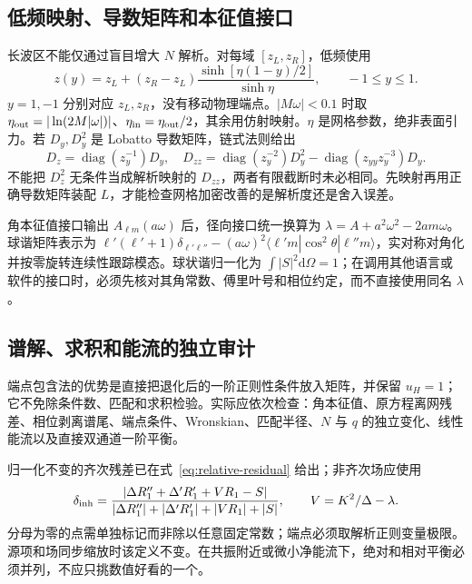 \documentclass[UTF8,fontset=fandol,11pt,a4paper,oneside]{ctexart}
\numberwithin{equation}{section}
\newcommand{\dd}{\mathrm d}
\begin{document}
\subsection{低频映射、导数矩阵和本征值接口}
长波区不能仅通过盲目增大 $N$ 解析。对每域 $[z_L,\allowbreak z_R]$，低频使用
\begin{equation}
 z(y)=z_L+(z_R-z_L)\frac{\sinh[\eta(1-y)/2]}{\sinh\eta},\qquad -1\le y\le1.
\end{equation}
$y=1,\allowbreak -1$ 分别对应 $z_L,\allowbreak z_R$，没有移动物理端点。$|M\omega|<0.1$ 时取 $\eta_{\rm out}=|\ln(2M|\omega|)|$、$\eta_{\rm in}=\eta_{\rm out}/2$，其余用仿射映射。$\eta$ 是网格参数，绝非表面引力。若 $D_y,\allowbreak D_y^2$ 是 Lobatto 导数矩阵，链式法则给出
\begin{equation}
 D_z=\operatorname{diag}(z_y^{-1})D_y,\quad
 D_{zz}=\operatorname{diag}(z_y^{-2})D_y^2
 -\operatorname{diag}(z_{yy}z_y^{-3})D_y.
\end{equation}
不能把 $D_z^2$ 无条件当成解析映射的 $D_{zz}$，两者有限截断时未必相同。先映射再用正确导数矩阵装配 $L$，才能检查网格加密改善的是解析度还是舍入误差。

角本征值接口输出 $A_{\ell m}(a\omega)$ 后，径向接口统一换算为 $\lambda=A+a^2\omega^2-2am\omega$。球谐矩阵表示为 $\ell'(\ell'+1)\delta_{\ell'\ell''}-(a\omega)^2\langle\ell'm|\cos^2\theta|\ell''m\rangle$，实对称对角化并按零旋转连续性跟踪模态。球状谐归一化为 $\int|S|^2\dd\Omega=1$；在调用其他语言或软件的接口时，必须先核对其角常数、傅里叶号和相位约定，而不直接使用同名 $\lambda$。

\subsection{谱解、求积和能流的独立审计}
端点包含法的优势是直接把退化后的一阶正则性条件放入矩阵，并保留 $u_H=1$；它不免除条件数、匹配和求积检验。实际应依次检查：角本征值、原方程离网残差、相位剥离谱尾、端点条件、Wronskian、匹配半径、$N$ 与 $q$ 的独立变化、线性能流以及直接双通道一阶平衡。

归一化不变的齐次残差已在式~\eqref{eq:relative-residual} 给出；非齐次场应使用
\begin{equation}
 \delta_{\rm inh}=
 \frac{|\Delta R_1''+\Delta'R_1'+VR_1-S|}
 {|\Delta R_1''|+|\Delta'R_1'|+|VR_1|+|S|},\qquad
 V=K^2/\Delta-\lambda.
\end{equation}
分母为零的点需单独标记而非除以任意固定常数；端点必须取解析正则变量极限。源项和场同步缩放时该定义不变。在共振附近或微小净能流下，绝对和相对平衡必须并列，不应只挑数值好看的一个。
\end{document}
